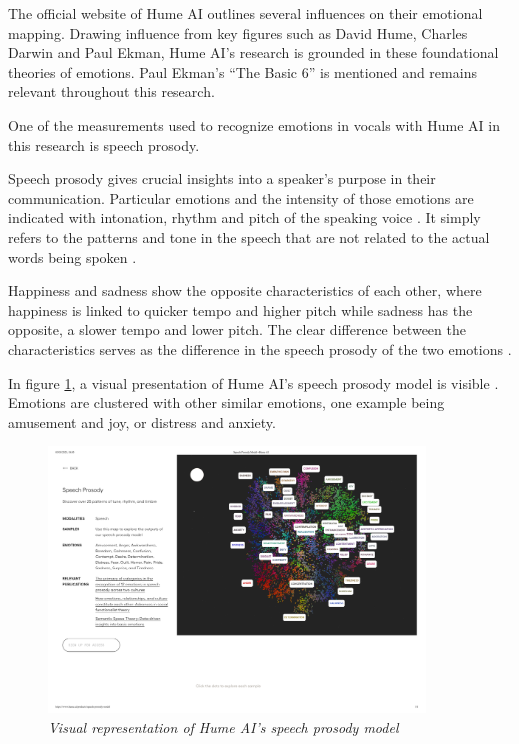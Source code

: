 The official website of Hume AI outlines several influences on their emotional mapping. Drawing influence from key figures such as David Hume, Charles Darwin and Paul Ekman, Hume AI’s research is grounded in these foundational theories of emotions. Paul Ekman’s “The Basic 6” is mentioned \autocite{HumeAI-AboutHume} and remains relevant throughout this research. 

One of the measurements used to recognize emotions in vocals with Hume AI in this research is speech prosody. 

Speech prosody gives crucial insights into a speaker’s purpose in their communication. Particular emotions and the intensity of those emotions are indicated with intonation, rhythm and pitch of the speaking voice \autocites{Thompson2004}{Tomasello2022}. It simply refers to the patterns and tone in the speech that are not related to the actual words being spoken \autocite{Cowen2019}.

Happiness and sadness show the opposite characteristics of each other, where happiness is linked to quicker tempo and higher pitch while sadness has the opposite, a slower tempo and lower pitch. The clear difference between the characteristics serves as the difference in the speech prosody of the two emotions \autocite{Thompson2004}. 

In figure \ref{fig:hume-ai-speech-prosody}, a visual presentation of Hume AI’s speech prosody model is visible \autocite{HumeAIProsody}. Emotions are clustered with other similar emotions, one example being amusement and joy, or distress and anxiety.

\begin{figure}[ht]
    \centering
    \includegraphics[width=10cm]{png/theoretical/hume-prosody.pdf}
    \caption{\textit{Visual representation of Hume AI’s speech prosody model} \autocite{HumeAIProsody}}
    \label{fig:hume-ai-speech-prosody}
\end{figure}

